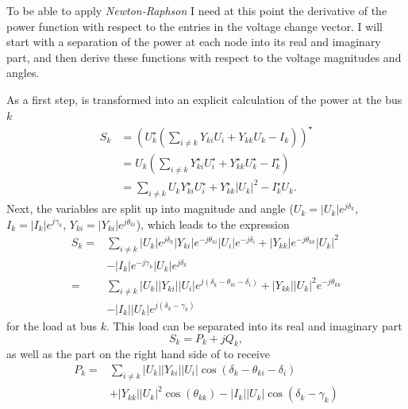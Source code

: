 To be able to apply \emph{Newton-Raphson} I need at this point the derivative of the power function with respect to the entries in the voltage change vector. I will start with a separation of the power at each node into its real and imaginary part, and then derive these functions with respect to the voltage magnitudes and angles.

As a first step,  is transformed into an explicit calculation of the power at the bus $k$
\begin{align}
	S_k &= \left( U_k^\star \left( \sum_{i \ne k} Y_{ki} U_i + Y_{kk} U_k - I_k \right) \right)^\star \\
		&= U_k \left( \sum_{i \ne k} Y_{ki}^\star U_i^\star + Y_{kk}^\star U_k^\star - I_k^\star \right) \\
		&= \sum_{i \ne k} U_k Y_{ki}^\star U_i^\star + Y_{kk}^\star |U_k|^2 - I_k^\star U_k.
	\label{eq:complex_power}
\end{align}
Next, the variables are split up into magnitude and angle ($U_k = |U_k| e^{j \delta_k}$, $I_k = |I_k| e^{j \gamma_k}$, $Y_{ki} = |Y_{ki}| e^{j \theta_{ki}}$), which leads to the expression
\begin{equation}
	\begin{split}
		S_k = 	& \sum_{i \ne k} |U_k| e^{j \delta_k} |Y_{ki}| e^{-j \theta_{ki}} |U_i| e^{-j \delta_i} + |Y_{kk}| e^{-j \theta_{kk}} |U_k|^2 \\
				& - |I_k| e^{-j \gamma_k} |U_k| e^{j \delta_k} \\
			= 	& \sum_{i \ne k} |U_k| |Y_{ki}| |U_i| e^{j \left( \delta_k - \theta_{ki} - \delta_i \right)} + |Y_{kk}| |U_k|^2 e^{-j \theta_{kk}} \\
				& - |I_k| |U_k| e^{j \left( \delta_k - \gamma_k \right)}
	\end{split}
	\label{eq:newton_raphson_polar}
\end{equation}
for the load at bus $k$. This load can be separated into its real and imaginary part
\begin{equation}
	S_k = P_k + j Q_k,
\end{equation}
as well as the part on the right hand side of  to receive
\begin{equation}
	\begin{split}
		P_k = 	& \sum_{i \ne k} |U_k| |Y_{ki}| |U_i| \cos \left( \delta_k - \theta_{ki} - \delta_i \right) \\
				& + |Y_{kk}| |U_k|^2 \cos \left( \theta_{kk} \right) - |I_k| |U_k| \cos \left( \delta_k - \gamma_k \right)
	\end{split}
\end{equation}
